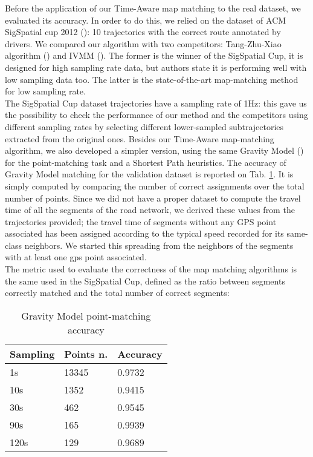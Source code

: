\documentclass[5p]{elsarticle}
\begin{document}
Before the application of our Time-Aware map matching to the real dataset, we evaluated its accuracy. In order to do this, we relied on the dataset 
of ACM SigSpatial cup 2012 (\cite{ali2012acm}): 10 trajectories with the correct route annotated by drivers. We compared our algorithm with two 
competitors: Tang-Zhu-Xiao algorithm (\cite{tang2012efficient}) and IVMM (\cite{yuan2010interactive}). The former is the winner of the SigSpatial Cup, 
it is designed for high sampling rate data, but authors state it is  performing well with low sampling data too. The latter is the state-of-the-art 
map-matching method for low sampling rate. \\
The SigSpatial Cup dataset trajectories have a sampling rate of 1Hz: this gave us the possibility to check the performance of our method and the competitors using different sampling rates
by selecting different lower-sampled subtrajectories extracted from the original ones. Besides our Time-Aware map-matching algorithm, 
we also developed a simpler version, using the same Gravity Model (\cite{cintia2013gravity}) for the point-matching task and a Shortest Path heuristics.
The accuracy of Gravity Model matching for the validation dataset is reported on Tab. \ref{gravity-accuracy}. It is simply computed by comparing the number of correct assignments over
the total number of points.
 Since we did not have a proper dataset to compute
the travel time of all the segments of the road network, we derived these values from the trajectories provided; the travel time of segments without any GPS point 
associated has been assigned according to the typical speed recorded for its same-class neighbors.  We started this spreading from the neighbors of 
the segments with at least one gps point associated. \\
The metric used to evaluate the correctness of the map matching algorithms is the same used in the SigSpatial Cup, 
defined as the ratio between segments correctly matched and the total number of correct segments: 
\begin{center}
 


\end{center}


\begin{center}
\begin{table}[h!]
\begin{tabular}{|l|l|l|}
\hline
\textbf{Sampling} & \textbf{Points n.} & \textbf{Accuracy} \\ \hline
1s                & 13345              & 0.9732    \\ \hline
10s               & 1352               & 0.9415    \\ \hline
30s               & 462                & 0.9545    \\ \hline
90s               & 165                & 0.9939   \\ \hline
120s              & 129                & 0.9689    \\ \hline
\end{tabular}
\caption{Gravity Model point-matching accuracy}
\label{gravity-accuracy}
\end{table}
\end{center}
\end{document}
